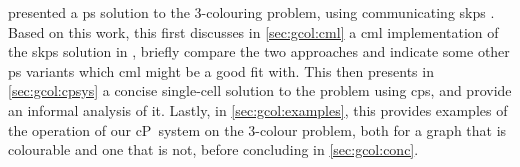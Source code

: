 
% 
% 
% 




\citeauthor{Gheorghe2013} presented a \gls{ps} solution to the 3-colouring problem, using communicating \gls{skps} \cite{Gheorghe2013}.  Based on this work, this  first discusses in \cref{sec:gcol:cml} a \gls{cml} implementation of the \gls{skps} solution in \cite{Gheorghe2013}, briefly compare the two approaches and indicate some other \gls{ps} variants which \gls{cml} might be a good fit with.  This  then presents in \cref{sec:gcol:cpsys} a concise single-cell solution to the problem using \gls{cps}, and provide an informal analysis of it.  Lastly, in \cref{sec:gcol:examples}, this  provides examples of the operation of our cP~system on the 3-colour problem, both for a graph that is colourable and one that is not, before concluding in \cref{sec:gcol:conc}.


